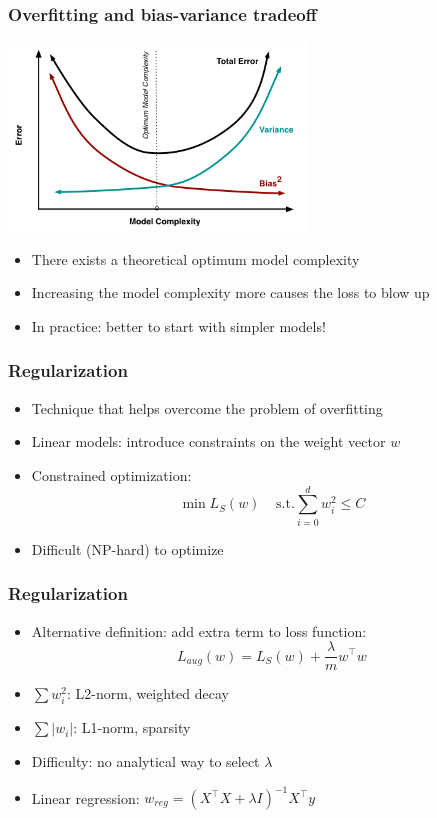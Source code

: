 \documentclass[10pt]{beamer}
\begin{document}
\begin{frame}
  \frametitle{Overfitting and bias-variance tradeoff}
  \begin{center}
  \includegraphics[height=5cm]{images/overfitting.png}
  \end{center}
  \begin{itemize}
	\item There exists a theoretical {\color{blue} optimum model complexity}
	\item Increasing the model complexity more causes the loss to blow up
	\item {\color{green} In practice}: better to start with simpler models!
  \end{itemize}
\end{frame}

\begin{frame}
  \frametitle{Regularization}
  \begin{itemize}
	\item Technique that helps overcome the problem of overfitting
	\item {\color{red} Linear models}: introduce constraints on the weight vector $w$
	\item {\color{blue} Constrained optimization}:
	\[\min L_S(w) \;\;\;\; \mathrm{s.t.} \sum_{i=0}^d w_i^2\leq C\]
	\item Difficult (NP-hard) to optimize
  \end{itemize}
\end{frame}

\begin{frame}
  \frametitle{Regularization}
  \begin{itemize}
	\item {\color{red} Alternative definition}: add extra term to loss function:
	\[L_{aug}(w)=L_S(w)+\frac \lambda m w^\top w\]
	\item $\sum w_i^2$: {\color{blue} L2-norm, weighted decay}
	\item $\sum |w_i|$: {\color{green} L1-norm, sparsity}
	\item {\color{cyan} Difficulty}: no analytical way to select $\lambda$
	\item {\color{green} Linear regression}: $w_{reg}=(X^\top X+\lambda I)^{-1}X^\top y$
  \end{itemize}
\end{frame}
\end{document}
